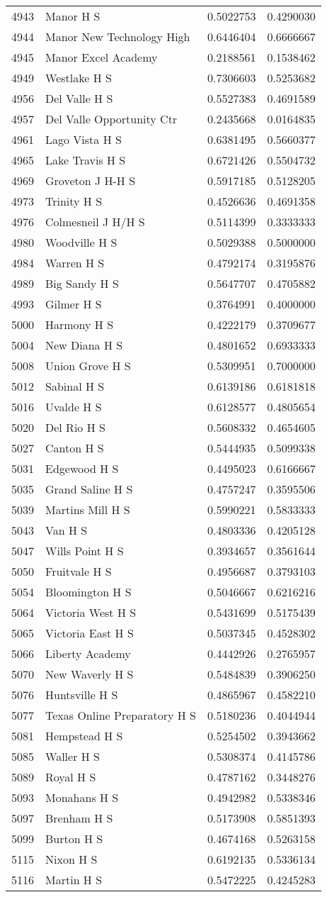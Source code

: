 \documentclass[
]{article}
\begin{document}
\begin{longtable}[]{@{}llrr@{}}
4943 & Manor H S & 0.5022753 & 0.4290030\tabularnewline
4944 & Manor New Technology High & 0.6446404 & 0.6666667\tabularnewline
4945 & Manor Excel Academy & 0.2188561 & 0.1538462\tabularnewline
4949 & Westlake H S & 0.7306603 & 0.5253682\tabularnewline
4956 & Del Valle H S & 0.5527383 & 0.4691589\tabularnewline
4957 & Del Valle Opportunity Ctr & 0.2435668 & 0.0164835\tabularnewline
4961 & Lago Vista H S & 0.6381495 & 0.5660377\tabularnewline
4965 & Lake Travis H S & 0.6721426 & 0.5504732\tabularnewline
4969 & Groveton J H-H S & 0.5917185 & 0.5128205\tabularnewline
4973 & Trinity H S & 0.4526636 & 0.4691358\tabularnewline
4976 & Colmesneil J H/H S & 0.5114399 & 0.3333333\tabularnewline
4980 & Woodville H S & 0.5029388 & 0.5000000\tabularnewline
4984 & Warren H S & 0.4792174 & 0.3195876\tabularnewline
4989 & Big Sandy H S & 0.5647707 & 0.4705882\tabularnewline
4993 & Gilmer H S & 0.3764991 & 0.4000000\tabularnewline
5000 & Harmony H S & 0.4222179 & 0.3709677\tabularnewline
5004 & New Diana H S & 0.4801652 & 0.6933333\tabularnewline
5008 & Union Grove H S & 0.5309951 & 0.7000000\tabularnewline
5012 & Sabinal H S & 0.6139186 & 0.6181818\tabularnewline
5016 & Uvalde H S & 0.6128577 & 0.4805654\tabularnewline
5020 & Del Rio H S & 0.5608332 & 0.4654605\tabularnewline
5027 & Canton H S & 0.5444935 & 0.5099338\tabularnewline
5031 & Edgewood H S & 0.4495023 & 0.6166667\tabularnewline
5035 & Grand Saline H S & 0.4757247 & 0.3595506\tabularnewline
5039 & Martins Mill H S & 0.5990221 & 0.5833333\tabularnewline
5043 & Van H S & 0.4803336 & 0.4205128\tabularnewline
5047 & Wills Point H S & 0.3934657 & 0.3561644\tabularnewline
5050 & Fruitvale H S & 0.4956687 & 0.3793103\tabularnewline
5054 & Bloomington H S & 0.5046667 & 0.6216216\tabularnewline
5064 & Victoria West H S & 0.5431699 & 0.5175439\tabularnewline
5065 & Victoria East H S & 0.5037345 & 0.4528302\tabularnewline
5066 & Liberty Academy & 0.4442926 & 0.2765957\tabularnewline
5070 & New Waverly H S & 0.5484839 & 0.3906250\tabularnewline
5076 & Huntsville H S & 0.4865967 & 0.4582210\tabularnewline
5077 & Texas Online Preparatory H S & 0.5180236 &
0.4044944\tabularnewline
5081 & Hempstead H S & 0.5254502 & 0.3943662\tabularnewline
5085 & Waller H S & 0.5308374 & 0.4145786\tabularnewline
5089 & Royal H S & 0.4787162 & 0.3448276\tabularnewline
5093 & Monahans H S & 0.4942982 & 0.5338346\tabularnewline
5097 & Brenham H S & 0.5173908 & 0.5851393\tabularnewline
5099 & Burton H S & 0.4674168 & 0.5263158\tabularnewline
5115 & Nixon H S & 0.6192135 & 0.5336134\tabularnewline
5116 & Martin H S & 0.5472225 & 0.4245283\tabularnewline

\end{longtable}
\end{document}
